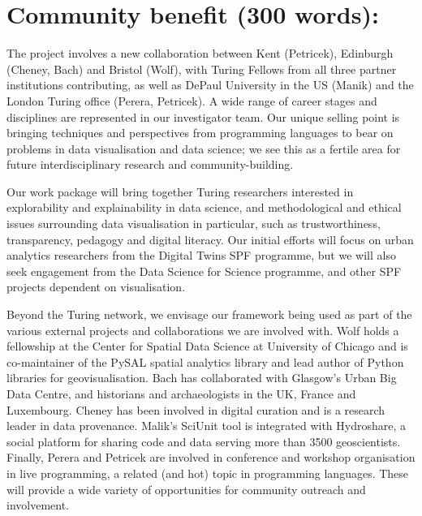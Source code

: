 \section*{Community benefit (300 words):}

The project involves a new collaboration between Kent (Petricek), Edinburgh
(Cheney, Bach) and Bristol (Wolf), with Turing Fellows from all three partner
institutions contributing, as well as DePaul University in the US (Manik) and
the London Turing office (Perera, Petricek). A wide range of career stages and
disciplines are represented in our investigator team. Our unique selling point
is bringing techniques and perspectives from programming languages to bear on
problems in data visualisation and data science; we see this as a fertile area
for future interdisciplinary research and community-building.

Our work package will bring together Turing researchers interested in
explorability and explainability in data science, and methodological and ethical
issues surrounding data visualisation in particular, such as trustworthiness,
transparency, pedagogy and digital literacy. Our initial efforts will focus on
urban analytics researchers from the Digital Twins SPF programme, but we will
also seek engagement from the Data Science for Science programme, and other SPF
projects dependent on visualisation.

Beyond the Turing network, we envisage our framework being used as part of the
various external projects and collaborations we are involved with. Wolf holds a
fellowship at the Center for Spatial Data Science at University of Chicago and
is co-maintainer of the PySAL spatial analytics library and lead author of
Python libraries for geovisualisation. Bach has collaborated with Glasgow's
Urban Big Data Centre, and historians and archaeologists in the UK, France and
Luxembourg. Cheney has been involved in digital curation and is a research
leader in data provenance. Malik's SciUnit tool is integrated with Hydroshare, a
social platform for sharing code and data serving more than 3500 geoscientists.
Finally, Perera and Petricek are involved in conference and workshop
organisation in live programming, a related (and hot) topic in programming
languages. These will provide a wide variety of opportunities for community
outreach and involvement.
